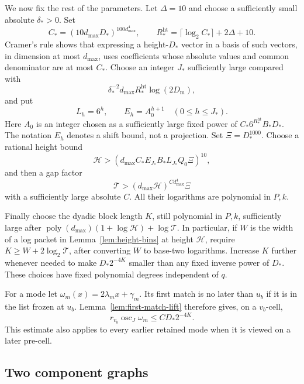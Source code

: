 We now fix the rest of the parameters.  Let \(\Delta=10\) and choose
a sufficiently small absolute \(\delta_*>0\).  Set
\[
 C_*=(10d_{\max}D_*)^{100d_{\max}^4},
 \qquad
 R_*^{\mathrm{ht}}=\lceil\log_2 C_*\rceil+2\Delta+10.
\]
Cramer's rule shows that expressing a height-\(D_*\) vector in a
basis of such vectors, in dimension at most \(d_{\max}\), uses
coefficients whose absolute values and common denominator are at
most \(C_*\).  Choose an integer \(J_*\) sufficiently large compared
with
\[
 \delta_*^{-2}d_{\max}R_*^{\mathrm{ht}}\log(2D_{\mathrm m}),
\]
and put
\[
 L_h=6^h,\qquad E_h=A_0^{h+1}\quad(0\le h\le J_*).
\]
Here \(A_0\) is an integer chosen as a sufficiently large fixed power
of \(C_*6^{R_*^{\mathrm{ht}}}B_*D_*\).
The notation \(E_h\) denotes a shift bound, not a projection.
Set \(\Xi=D_*^{1000}\).  Choose a rational height bound
\[
 \mathcal H>
 (d_{\max}C_*E_{J_*}B_*L_{J_*}Q_0\Xi)^{10},
\]
and then a gap factor
\[
 \mathcal T>(d_{\max}\mathcal H)^{C d_{\max}^4}\Xi
\]
with a sufficiently large absolute \(C\).
All their logarithms are polynomial in \(P,k\).

Finally choose the dyadic block length \(K\), still polynomial in
\(P,k\), sufficiently large after
\(\operatorname{poly}(d_{\max})(1+\log\mathcal H)+\log\mathcal T\).
In particular, if \(W\) is the width of a log packet in
Lemma~\ref{lem:height-bins} at height \(\mathcal H\), require
\(K\ge W+2\log_2\mathcal T\), after converting \(W\) to base-two
logarithms.  Increase \(K\) further whenever needed to make
\(D_*2^{-4K}\) smaller than any fixed inverse power of \(D_*\).
These choices have fixed polynomial degrees independent of \(q\).

For a mode let
\(\omega_m(x)=2\lambda_mx+\gamma_m\).
Its first match is no later than \(u_b\) if it is in the list frozen
at \(u_b\).  Lemma~\ref{lem:first-match-lift} therefore gives, on a
\(v_b\)-cell,
\[
 r_{v_b}\operatorname{osc}_{J}\omega_m
       \le C D_*2^{-4K}.
\]
This estimate also applies to every earlier retained mode when it is
viewed on a later pre-cell.

\subsection{Two component graphs}

